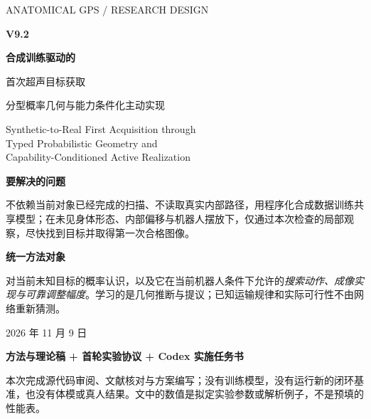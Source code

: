 \documentclass[UTF8,fontset=fandol,11pt,a4paper]{ctexart}
\theoremstyle{plain}
\theoremstyle{definition}
\theoremstyle{remark}
\numberwithin{equation}{section}
\begin{document}
\begin{titlepage}
\vspace*{6mm}
{\Large\sffamily\color{accent}ANATOMICAL GPS / RESEARCH DESIGN}\par
\vspace{12mm}
{\fontsize{38}{44}\selectfont\bfseries\color{ink}V9.2}\par
\vspace{9mm}
{\fontsize{24}{33}\selectfont\bfseries\color{ink}合成训练驱动的\par 首次超声目标获取}\par
\vspace{5mm}
{\Large 分型概率几何与能力条件化主动实现}\par
\vspace{8mm}
{\large Synthetic-to-Real First Acquisition through\\Typed Probabilistic Geometry and\\Capability-Conditioned Active Realization}\par
\vspace{10mm}
\begin{corebox}
\textbf{要解决的问题}\par
不依赖当前对象已经完成的扫描、不读取真实内部路径，用程序化合成数据训练共享模型；在未见身体形态、内部偏移与机器人摆放下，仅通过本次检查的局部观察，尽快找到目标并取得第一次合格图像。
\medskip\par
\textbf{统一方法对象}\par
对当前未知目标的概率认识，以及它在当前机器人条件下允许的\emph{搜索动作、成像实现与可靠调整幅度}。学习的是几何推断与提议；已知运输规律和实际可行性不由网络重新猜测。
\end{corebox}
\vfill
2026 年 11 月 9 日\par
\vspace{3mm}
\textbf{方法与理论稿 + 首轮实验协议 + Codex 实施任务书}\par
\vspace{3mm}
{\small 本次完成源代码审阅、文献核对与方案编写；没有训练模型，没有运行新的闭环基准，也没有体模或真人结果。文中的数值是拟定实验参数或解析例子，不是预填的性能表。}
\end{titlepage}
\end{document}
